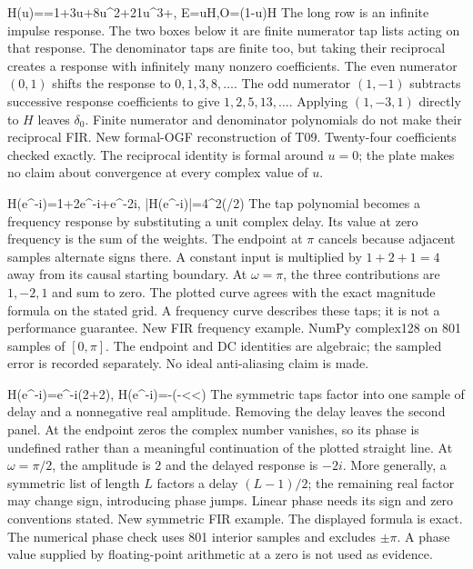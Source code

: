 {H(u)==1+3u+8u^2+21u^3+\cdots,
 \qquad E=uH,\quad O=(1-u)H}
{The long row is an infinite impulse response. The two boxes below it are finite numerator tap lists acting on that response. The denominator taps are finite too, but taking their reciprocal creates a response with infinitely many nonzero coefficients.}
{The even numerator $(0,1)$ shifts the response to $0,1,3,8,\ldots$. The odd numerator $(1,-1)$ subtracts successive response coefficients to give $1,2,5,13,\ldots$. Applying $(1,-3,1)$ directly to $H$ leaves $\delta_0$.}
{Finite numerator and denominator polynomials do not make their reciprocal FIR.}
{New formal-OGF reconstruction of T09. Twenty-four coefficients checked exactly. The reciprocal identity is formal around $u=0$; the plate makes no claim about convergence at every complex value of $u$.}

{H(e^{-i\omega})=1+2e^{-i\omega}+e^{-2i\omega},\qquad
 |H(e^{-i\omega})|=4\cos^2(\omega/2)}
{The tap polynomial becomes a frequency response by substituting a unit complex delay. Its value at zero frequency is the sum of the weights. The endpoint at $\pi$ cancels because adjacent samples alternate signs there.}
{A constant input is multiplied by $1+2+1=4$ away from its causal starting boundary. At $\omega=\pi$, the three contributions are $1,-2,1$ and sum to zero. The plotted curve agrees with the exact magnitude formula on the stated grid.}
{A frequency curve describes these taps; it is not a performance guarantee.}
{New FIR frequency example. NumPy complex128 on 801 samples of $[0,\pi]$. The endpoint and DC identities are algebraic; the sampled error is recorded separately. No ideal anti-aliasing claim is made.}

{H(e^{-i\omega})=e^{-i\omega}(2+2\cos\omega),\qquad
 \arg H(e^{-i\omega})=-\omega\quad(-\pi<\omega<\pi)}
{The symmetric taps factor into one sample of delay and a nonnegative real amplitude. Removing the delay leaves the second panel. At the endpoint zeros the complex number vanishes, so its phase is undefined rather than a meaningful continuation of the plotted straight line.}
{At $\omega=\pi/2$, the amplitude is $2$ and the delayed response is $-2i$. More generally, a symmetric list of length $L$ factors a delay $(L-1)/2$; the remaining real factor may change sign, introducing phase jumps.}
{Linear phase needs its sign and zero conventions stated.}
{New symmetric FIR example. The displayed formula is exact. The numerical phase check uses 801 interior samples and excludes $\pm\pi$. A phase value supplied by floating-point arithmetic at a zero is not used as evidence.}


